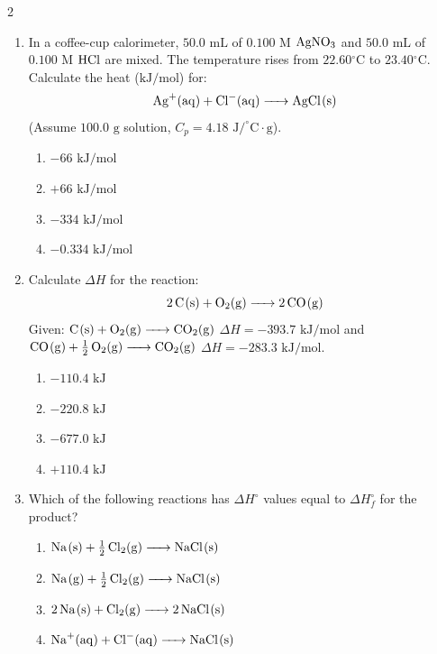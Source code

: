 \documentclass[12pt,letterpaper]{article}
\begin{document}
\begin{multicols*}{2}
\begin{enumerate}
        \item In a coffee-cup calorimeter, $50.0\text{ mL}$ of $0.100\text{ M}$ $\ce{AgNO3}$ and $50.0\text{ mL}$ of $0.100\text{ M}$ $\ce{HCl}$ are mixed. The temperature rises from $22.60\text{}^\circ\text{C}$ to $23.40\text{}^\circ\text{C}$. Calculate the heat ($\text{kJ/mol}$) for:
            \begin{equation*}
                \ce{Ag+(aq) + Cl-(aq) -> AgCl(s)}
            \end{equation*}
            (Assume $100.0\text{ g}$ solution, $C_p = 4.18\text{ J/}^\circ\text{C}\cdot\text{g}$). %
            \begin{enumerate}
                \item $-66\text{ kJ/mol}$
                \item $+66\text{ kJ/mol}$
                \item $-334\text{ kJ/mol}$
                \item $-0.334\text{ kJ/mol}$
            \end{enumerate}
        \columnbreak
        \item Calculate $\Delta H$ for the reaction:
            \begin{equation*}
                \ce{2C(s) + O2(g) -> 2CO(g)}
            \end{equation*}
            Given: $\ce{C(s) + O2(g) -> CO2(g)}$ $\Delta H = -393.7\text{ kJ/mol}$ and $\ce{CO(g) + 1/2O2(g) -> CO2(g)}$ $\Delta H = -283.3\text{ kJ/mol}$. %
            \begin{enumerate}
                \item $-110.4\text{ kJ}$
                \item $-220.8\text{ kJ}$
                \item $-677.0\text{ kJ}$
                \item $+110.4\text{ kJ}$
            \end{enumerate}

        \item Which of the following reactions has $\Delta H^\circ$ values equal to $\Delta H_f^\circ$ for the product? %
            \begin{enumerate}
                \item $\ce{Na(s) + 1/2Cl2(g) -> NaCl(s)}$
                \item $\ce{Na(g) + 1/2Cl2(g) -> NaCl(s)}$
                \item $\ce{2Na(s) + Cl2(g) -> 2NaCl(s)}$
                \item $\ce{Na+(aq) + Cl-(aq) -> NaCl(s)}$
            \end{enumerate}


\end{enumerate}
\end{multicols*}
\end{document}

